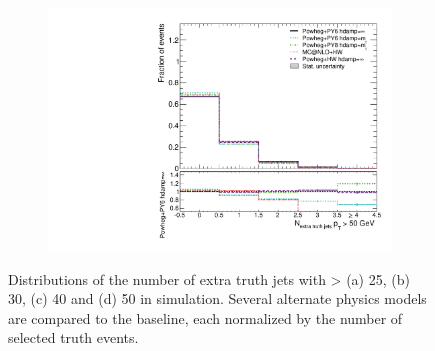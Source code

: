 \begin{figure}
\begin{subfigure}[]{0.45\textwidth}
\end{subfigure}
\begin{subfigure}[]{0.45\textwidth}
\includegraphics[width=\textwidth]{fig/MCComp/NLO/NTruthExtraJets50.pdf}
\end{subfigure}
\caption{Distributions of the number of extra truth jets with \pt > (a) 25, (b) 30, (c) 40 and (d) 50 \GeV in \ttbar simulation. Several alternate physics models are compared to the baseline, each normalized by the number of selected truth events.}
\label{fig:ntruthjets}
\end{figure}
